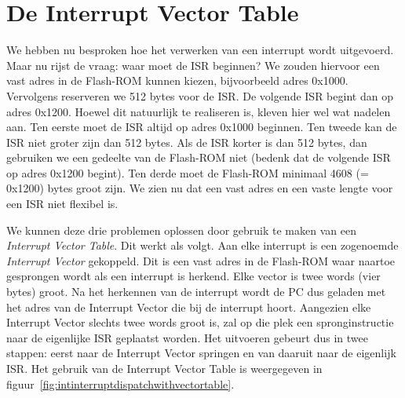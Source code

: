 \section{De Interrupt Vector Table}
We hebben nu besproken hoe het verwerken van een interrupt wordt uitgevoerd.
Maar nu rijst de vraag: waar moet de ISR beginnen? We zouden hiervoor een
vast adres in de Flash-ROM kunnen kiezen, bijvoorbeeld adres 0x1000.
Vervolgens reserveren we 512 bytes voor de ISR. De volgende ISR begint dan
op adres 0x1200. Hoewel dit natuurlijk te realiseren is, kleven hier wel
wat nadelen aan. Ten eerste moet de ISR altijd op adres 0x1000 beginnen.
Ten tweede kan de ISR niet groter zijn dan 512 bytes. Als de ISR korter is
dan 512 bytes, dan gebruiken we een gedeelte van de Flash-ROM niet (bedenk
dat de volgende ISR op adres 0x1200 begint). Ten derde moet de Flash-ROM
minimaal 4608 (= 0x1200) bytes groot zijn. We zien nu dat een vast adres
en een vaste lengte voor een ISR niet flexibel is.

We kunnen deze drie problemen oplossen door gebruik te maken van een
\textsl{Interrupt Vector Table}. Dit werkt als volgt. Aan elke interrupt is
een zogenoemde \textsl{Interrupt Vector} gekoppeld. Dit is een vast adres
in de Flash-ROM waar naartoe gesprongen wordt als een interrupt is herkend.
Elke vector is twee words (vier bytes) groot. Na het herkennen van de
interrupt wordt de PC dus geladen met het adres van de Interrupt Vector die
bij de interrupt hoort.
Aangezien elke Interrupt Vector slechts twee words groot is, zal op die
plek een spronginstructie naar de eigenlijke ISR geplaatst worden. Het
uitvoeren gebeurt dus in twee stappen: eerst naar de Interrupt Vector
springen en van daaruit naar de eigenlijk ISR. Het gebruik van de
Interrupt Vector Table is weergegeven in
figuur~\ref{fig:intinterruptdispatchwithvectortable}.


